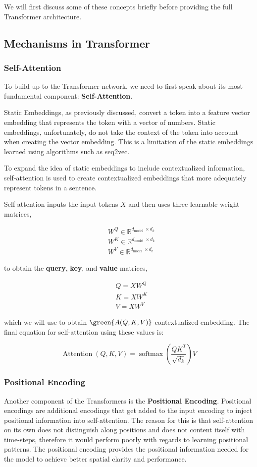 \documentclass[11pt,twoside]{article}
\begin{document}
We will first discuss some of these concepts briefly before providing the full Transformer architecture.

\subsection{Mechanisms in Transformer}
\subsubsection{Self-Attention}
To build up to the Transformer network, we need to first speak about its most fundamental component: \textbf{Self-Attention}.

Static Embeddings, as previously discussed, convert a token into a feature vector embedding that represents the token with a vector of numbers. Static embeddings, unfortunately, do not take the context of the token into account when creating the vector embedding. This is a limitation of the static embeddings learned using algorithms such as seq2vec.

To expand the idea of static embeddings to include contextualized information, self-attention is used to create contextualized embeddings that more adequately represent tokens in a sentence.

Self-attention inputs the input tokens ${X}$ and then uses three learnable weight matrices,

$$
\begin{align*}
&W^Q \in \mathbb{R}^{d_{\text {model }} \times d_k} \\ &W^K \in \mathbb{R}^{d_{\text {model }} \times d_k} \\&W^V \in \mathbb{R}^{d_{\text {model }} \times d_v}
\end{align*}
$$

to obtain the \textbf{query}, \textbf{key}, and \textbf{value} matrices,

$$
{
\begin{align*}
&Q = XW^Q  \\
&K = XW^K\\
&V = XW^V
\end{align*}
}
$$

which we will use to obtain $\green{A(Q, K, V)}$ contextualized embedding. The final equation for self-attention using these values is:

$$
\operatorname{Attention}(Q, K, V)=\operatorname{softmax}\left(\frac{Q K^T}{\sqrt{d_k}}\right) V$$

\subsubsection{Positional Encoding}
Another component of the Transformers is the \textbf{Positional Encoding}. Positional encodings are additional encodings that get added to the input encoding to inject positional information into self-attention. The reason for this is that self-attention on its own does not distinguish along positions and does not content itself with time-steps, therefore it would perform poorly with regards to learning positional patterns. The positional encoding provides the positional information needed for the model to achieve better spatial clarity and performance.
\end{document}
